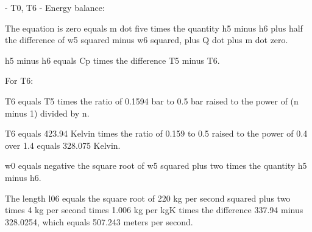 - T0, T6
- Energy balance:

The equation is zero equals m dot five times the quantity h5 minus h6 plus half the difference of w5 squared minus w6 squared, plus Q dot plus m dot zero.

h5 minus h6 equals Cp times the difference T5 minus T6.

For T6:

T6 equals T5 times the ratio of 0.1594 bar to 0.5 bar raised to the power of (n minus 1) divided by n.

T6 equals 423.94 Kelvin times the ratio of 0.159 to 0.5 raised to the power of 0.4 over 1.4 equals 328.075 Kelvin.

w0 equals negative the square root of w5 squared plus two times the quantity h5 minus h6.

The length l06 equals the square root of 220 kg per second squared plus two times 4 kg per second times 1.006 kg per kgK times the difference 337.94 minus 328.0254, which equals 507.243 meters per second.